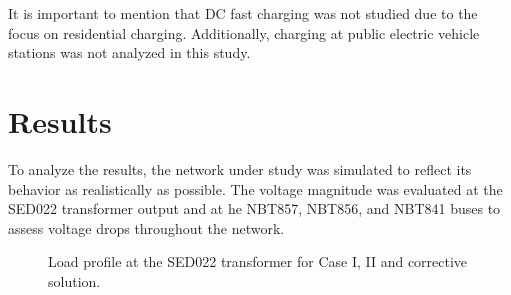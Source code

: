 \documentclass[12pt, 3p]{elsarticle}
\begin{document}
It is important to mention that DC fast charging was not studied 
due to the focus on residential charging. Additionally, charging 
at public electric vehicle stations was not analyzed in this study.


\section{Results}\label{sec:results}
  
To analyze the results, the network under study was simulated 
to reflect its behavior as realistically as possible. The voltage 
magnitude was evaluated at the SED022 transformer output and at 
he NBT857, NBT856, and NBT841 buses to assess voltage drops 
throughout the network.

\begin{figure}
    \centering
    \caption{Load profile at the SED022 transformer for Case I, II and corrective solution.}
    \label{fig:case_I_peak}
\end{figure}
\end{document}
